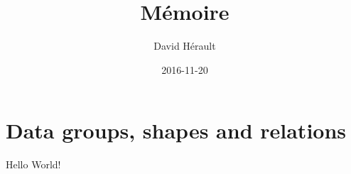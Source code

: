 \documentclass{article}
\title{M\'{e}moire}
\date{2016-11-20}
\author{David H\'{e}rault}
\begin{document}
\maketitle
\newpage
{}

\tableofcontents
\newpage

\section{Data groups, shapes and relations}

  Hello World!
\end{document}
